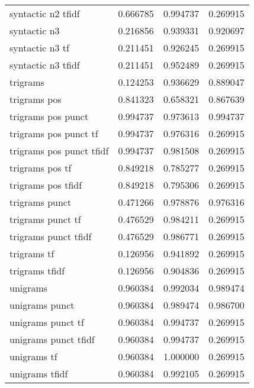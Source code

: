 \begin{tabular}{lrrr}
syntactic n2 tfidf         &  0.666785 &       0.994737 &             0.269915 \\
syntactic n3               &  0.216856 &       0.939331 &             0.920697 \\
syntactic n3 tf            &  0.211451 &       0.926245 &             0.269915 \\
syntactic n3 tfidf         &  0.211451 &       0.952489 &             0.269915 \\
trigrams                   &  0.124253 &       0.936629 &             0.889047 \\
trigrams pos               &  0.841323 &       0.658321 &             0.867639 \\
trigrams pos punct         &  0.994737 &       0.973613 &             0.994737 \\
trigrams pos punct tf      &  0.994737 &       0.976316 &             0.269915 \\
trigrams pos punct tfidf   &  0.994737 &       0.981508 &             0.269915 \\
trigrams pos tf            &  0.849218 &       0.785277 &             0.269915 \\
trigrams pos tfidf         &  0.849218 &       0.795306 &             0.269915 \\
trigrams punct             &  0.471266 &       0.978876 &             0.976316 \\
trigrams punct tf          &  0.476529 &       0.984211 &             0.269915 \\
trigrams punct tfidf       &  0.476529 &       0.986771 &             0.269915 \\
trigrams tf                &  0.126956 &       0.941892 &             0.269915 \\
trigrams tfidf             &  0.126956 &       0.904836 &             0.269915 \\
unigrams                   &  0.960384 &       0.992034 &             0.989474 \\
unigrams punct             &  0.960384 &       0.989474 &             0.986700 \\
unigrams punct tf          &  0.960384 &       0.994737 &             0.269915 \\
unigrams punct tfidf       &  0.960384 &       0.994737 &             0.269915 \\
unigrams tf                &  0.960384 &       1.000000 &             0.269915 \\
unigrams tfidf             &  0.960384 &       0.992105 &             0.269915 \\
\bottomrule
\end{tabular}
